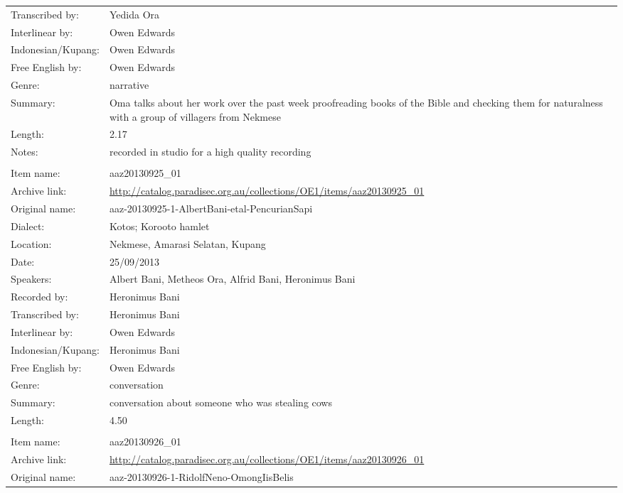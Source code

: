 \begin{longtable}{lL{.67\textwidth}}
Transcribed by:		& Yedida Ora\\
Interlinear by:		& Owen Edwards \\
Indonesian/Kupang:		& Owen Edwards\\
Free English by:		& Owen Edwards\\
Genre:				& narrative\\
Summary:				& Oma talks about her work over the past week proofreading books
						of the Bible and checking them for naturalness
						with a group of villagers from Nekmese{\Q}\\
Length:				& 2.17\\
Notes:				& recorded in studio for a high quality recording\\ \lspbottomrule
{}			& \\
Item name:			& aaz20130925{\_}01\\
Archive link:			& \url{http://catalog.paradisec.org.au/collections/OE1/items/aaz20130925_01}\\
Original name:			& aaz-20130925-1-AlbertBani-etal-PencurianSapi\\
Dialect:				& Kotos; Koro{\Q}oto hamlet \\
Location:				& Nekmese{\Q}, Amarasi Selatan, Kupang \\
Date:				& 25/09/2013\\
Speakers:				& Albert Bani, Metheos Ora, Alfrid Bani, Heronimus Bani\\
Recorded by:			& Heronimus Bani\\
Transcribed by:		& Heronimus Bani\\
Interlinear by:		& Owen Edwards \\
Indonesian/Kupang:		& Heronimus Bani\\
Free English by:		& Owen Edwards\\
Genre:				& conversation\\
Summary:				& conversation about someone who was stealing cows\\
Length:				& 4.50\\ \lspbottomrule
{}			& \\
Item name:			& aaz20130926{\_}01\\
Archive link:			& \url{http://catalog.paradisec.org.au/collections/OE1/items/aaz20130926_01}\\
Original name:			& aaz-20130926-1-RidolfNeno-OmongIisBelis\\

\end{longtable}
